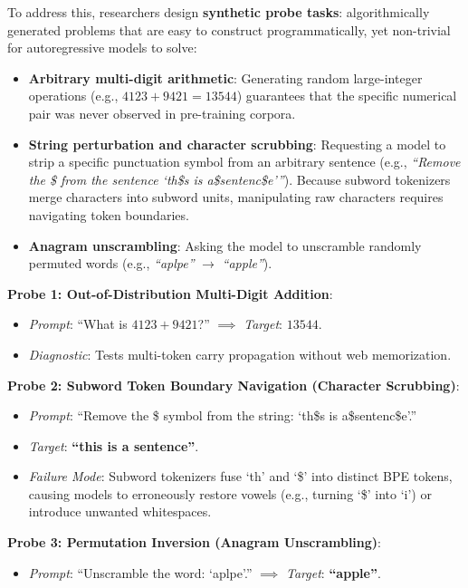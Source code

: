 \documentclass[../../main.tex]{subfiles}
\begin{document}
To address this, researchers design \textbf{synthetic probe tasks}: algorithmically generated problems that are easy to construct programmatically, yet non-trivial for autoregressive models to solve:
\begin{itemize}
    \item \textbf{Arbitrary multi-digit arithmetic}: Generating random large-integer operations (e.g., $4123 + 9421 = 13544$) guarantees that the specific numerical pair was never observed in pre-training corpora.
    \item \textbf{String perturbation and character scrubbing}: Requesting a model to strip a specific punctuation symbol from an arbitrary sentence (e.g., \textit{``Remove the \$ from the sentence `th\$s is a\$sentenc\$e'''}). Because subword tokenizers merge characters into subword units, manipulating raw characters requires navigating token boundaries.
    \item \textbf{Anagram unscrambling}: Asking the model to unscramble randomly permuted words (e.g., \textit{``aplpe''} $\to$ \textit{``apple''}).
\end{itemize}

\begin{center}
\begin{minipage}{0.95\textwidth}
\begin{tcolorbox}[colback=cardBg,colframe=cardLine,arc=2pt,boxrule=0.5pt,title=\textbf{Task Example: Synthetic Diagnostic Probes}]
\small\sffamily
\textbf{Probe 1: Out-of-Distribution Multi-Digit Addition}:
\begin{itemize}[leftmargin=1.5em,itemsep=1pt]
    \item \textit{Prompt}: ``What is $4123 + 9421$?'' $\implies$ \textit{Target}: \textbf{$13544$}.
    \item \textit{Diagnostic}: Tests multi-token carry propagation without web memorization.
\end{itemize}
\textbf{Probe 2: Subword Token Boundary Navigation (Character Scrubbing)}:
\begin{itemize}[leftmargin=1.5em,itemsep=1pt]
    \item \textit{Prompt}: ``Remove the \$ symbol from the string: `th\$s is a\$sentenc\$e'.''
    \item \textit{Target}: \textbf{``this is a sentence''}.
    \item \textit{Failure Mode}: Subword tokenizers fuse `th' and `\$' into distinct BPE tokens, causing models to erroneously restore vowels (e.g., turning `\$' into `i') or introduce unwanted whitespaces.
\end{itemize}
\textbf{Probe 3: Permutation Inversion (Anagram Unscrambling)}:
\begin{itemize}[leftmargin=1.5em,itemsep=1pt]
    \item \textit{Prompt}: ``Unscramble the word: `aplpe'.'' $\implies$ \textit{Target}: \textbf{``apple''}.
\end{itemize}
\end{tcolorbox}
\end{minipage}
\end{center}
\end{document}
